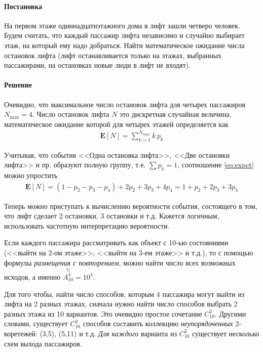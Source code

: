\documentclass[%
	11pt,
	a4paper,
	utf8,
		]{article}
\begin{document}
\paragraph{Постановка} На первом этаже одиннадцатиэтажного дома в лифт зашли четверо человек. Будем считать, что каждый пассажир лифта независимо и случайно выбирает этаж, на который ему надо добраться. Найти математическое ожидание числа остановок лифта (лифт останавливается только на этажах, выбранных пассажирами, на остановках новые люди в лифт не входят).

\paragraph{Решение} Очевидно, что максимальное число остановок лифта для четырех пассажиров $ N_{\max} = 4 $. Число остановок лифта $ N $ это дискретная случайная величина, математическое ожидание которой для четырех этажей определяется как
\begin{align}\label{eq:expct}
	\mathbf{E}[N] = \sum_{k=1}^{N_{max}} k \, p_k
\end{align}

Учитывая, что события <<Одна остановка лифта>>, <<Две остановки лифта>> и пр. образуют полную группу, т.е. $ \sum p_k = 1 $, соотношение \eqref{eq:expct} можно упростить
\begin{align*}
	\mathbf{E}[N] = (1 - p_2 - p_3 - p_4) + 2 p_2 + 3 p_3 + 4 p_4 = 1 + p_2 + 2 p_3 + 3 p_4
\end{align*}

Теперь можно приступать к вычислению вероятности события, состоящего в том, что лифт сделает 2 остановки, 3 остановки и т.д. Кажется логичным, использовать частотную интерпретацию вероятности.

Если каждого пассажира рассматривать как объект с 10-ью состояниями (<<выйти на 2-ом этаже>>, <<выйти на 3-ем этаже>> и т.д.), то с помощью формулы \emph{размещения с повторением}, можно найти число всех возможных исходов, а именно $ \stackrel{\circlearrowright}{A_{10}^4} = 10^4 $.

Для того чтобы, найти число способов, которым 4 пассажира могут выйти из лифта на 2 разных этажах, сначала нужно найти число способов выбрать 2 разных этажа из 10 вариантов. Это очевидно простое сочетание $ C_{10}^2 $. Другими словами, существует $ C_{10}^2 $ способов составить коллекцию \emph{неупорядоченных} 2-коретежей: (3,5), (5,11) и т.д. \emph{Для каждого} варианта из $ C_{10}^2 $ существует несколько схем выхода пассажиров.
\end{document}
